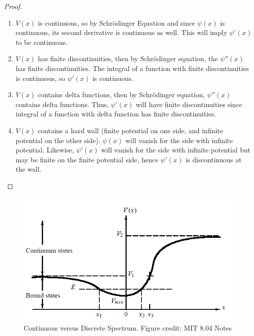 \documentclass[a4paper]{article}
\begin{document}
\begin{proof}\leavevmode
\begin{enumerate}
\item $V(x)$ is continuous, so by Schr\"{o}dinger Equation and since $\psi(x)$ is continuous, its second derivative is continuous as well. This will imply $\psi'(x)$ to be continuous.
\item $V(x)$ has finite discontinuities, then by Schr\"{o}dinger equation, the $\psi''(x)$ has finite discontinuities. The integral of a function with finite discontinuities is continuous, so $\psi'(x)$ is continuous.
\item $V(x)$ contains delta functions, then by Schr\"{o}dinger equation, $\psi''(x)$ contains delta functions. Thus, $\psi'(x)$ will have finite discontinuities since integral of a function with delta function has finite discontinuities. 
\item $V(x)$ contains a hard wall (finite potential on one side, and infinite potential on the other side). $\psi(x)$ will vanish for the side with infinite potential. Likewise, $\psi'(x)$ will vanish for the side with infinite potential but may be finite on the finite potential side, hence $\psi'(x)$ is discontinuous at the wall.
\end{enumerate}
\end{proof}
\begin{figure}[H]
    \centering
    \includegraphics[scale=0.65]{continuumbound.PNG}
    \caption{Continuous versus Discrete Spectrum. Figure credit: MIT 8.04 Notes}
\end{figure}
\newpage
\end{document}
